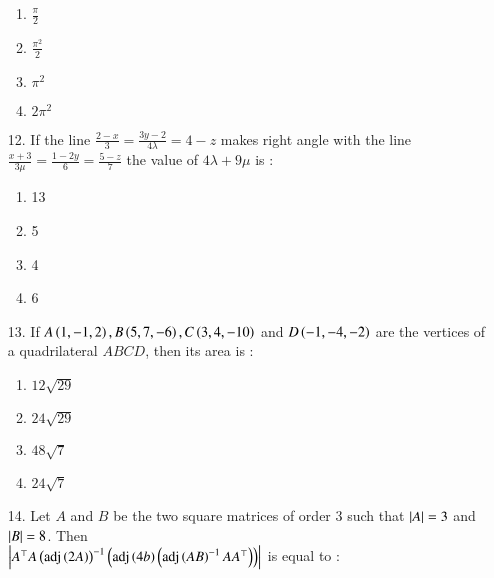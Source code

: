\documentclass[journal,12pt,onecolumn]{IEEEtran}
\theoremstyle{remark}
\begin{document}
\begin{enumerate}
	\begin{multicols}{4}
		\begin{enumerate}
            \item $\frac{\pi}{2}$ \columnbreak
            \item $\frac{\pi ^ 2}{2}$ \columnbreak
            \item $\pi ^ 2$ \columnbreak
			\item $2\pi ^2 $
		\end{enumerate}
	\end{multicols}
\item[12.] If the line $\frac{2-x}{3} = \frac{3y-2}{4\lambda} = 4-z$ makes right angle with 
    the line $\frac{x+3}{3\mu} = \frac{1-2y}{6} = \frac{5-z}{7}$ the value of $4\lambda + 9\mu$ is :
		\hfill{}
		\begin{multicols}{4}
		\begin{enumerate}
			\item 13 \columnbreak
			\item 5 \columnbreak 
			\item 4 \columnbreak
			\item 6
		\end{enumerate}
        \end{multicols}
    \item[13.] If $A\left(1, -1, 2\right), B\left(5, 7, -6\right), C\left(3, 4, -10\right)$ and $D\left(-1, -4, -2\right)$ 
        are the vertices of a quadrilateral $ABCD$, then its area is :
		\hfill{\brak{2024-Apr}}
	\begin{multicols}{4}
		\begin{enumerate}
            \item $12\sqrt{29}$ \columnbreak
            \item $24\sqrt{29}$ \columnbreak
            \item $48\sqrt{7}$ \columnbreak
            \item $24\sqrt{7}$
		\end{enumerate}
	\end{multicols}
\item[14.] Let $A$ and $B$ be the two square matrices of order 3 such that $\left\vert A\right\vert = 3$ 
    and $\left\vert B\right\vert = 8$. Then\\ 
    $\left\vert A^{\top}A\left(\textnormal{adj}\left(2A\right)\right)^{-1}\left(\textnormal{adj}\left(4b\right)\left(\textnormal{adj}\left(AB\right)^{-1}AA^{\top}\right)\right)\right\vert$
    is equal to :
		\hfill{}
	\begin{multicols}{4}
		\begin{enumerate}

\end{enumerate}
\end{multicols}
\end{enumerate}
\end{document}
